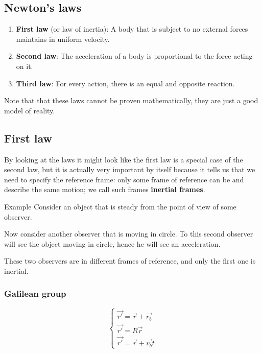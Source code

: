 \documentclass[10pt]{extarticle}
\begin{document}
\subsection{Newton's laws}

\begin{enumerate}
  \item \textbf{First law} (or law of inertia): A body that is subject to no external forces maintains in uniform velocity.
  \item \textbf{Second law}: The acceleration of a body is proportional to the force acting on it.
  \item \textbf{Third law}: For every action, there is an equal and opposite reaction.
\end{enumerate}

Note that that these laws cannot be proven mathematically, they are just a good model of reality.

\subsection{First law}

By looking at the laws it might look like the first law is a special case of the second law,
but it is actually very important by itself because it tells us that we need to specify the reference frame:
only some frame of reference can be  and describe the same motion; we call such frames \textbf{inertial frames}.

\begin{examplebox}{Example}
  Consider an object that is steady from the point of view of some observer.

  Now consider another observer that is moving in circle.
  To this second observer will see the object moving in circle, hence he will see an acceleration.

  These two observers are in different frames of reference, and only the first one is inertial.
\end{examplebox}

\subsubsection{Galilean group}

$$
  \begin{cases}
    \vec {r'} = \vec r + \vec{r_b} \\
    \vec {r'} = R \vec r           \\
    \vec {r'} = \vec r + \vec{v_b} t
  \end{cases}
$$
\end{document}
